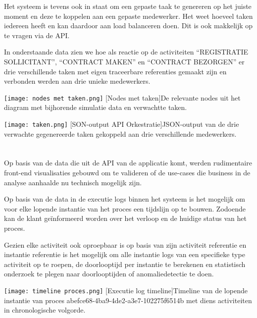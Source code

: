 Het systeem is tevens ook in staat om een gepaste taak te genereren op het juiste moment en deze te koppelen aan een gepaste medewerker. Het weet hoeveel taken iedereen heeft en kan daardoor aan load balanceren doen. Dit is ook makkelijk op te vragen via de API.\newline

In onderstaande data zien we hoe als reactie op de activiteiten “REGISTRATIE SOLLICITANT”, “CONTRACT MAKEN” en “CONTRACT BEZORGEN” er drie verschillende taken met eigen traceerbare referenties gemaakt zijn en verbonden werden aan drie unieke medewerkers.
\begin{center}
  \captionsetup{type=figure}
  \texttt{[image: nodes met taken.png]}
  [Nodes met taken]{De relevante nodes uit het diagram met bijhorende simulatie data en verwachtte taken.}
\end{center}
\begin{center}
  \captionsetup{type=figure}
  \texttt{[image: taken.png]}
  [SON-output API Orkestratie]{JSON-output van de drie verwachte gegenereerde taken gekoppeld aan drie verschillende medewerkers.}
\end{center}
\section{}%
\label{sec:visualisatie}
Op basis van de data die uit de API van de applicatie komt, werden rudimentaire front-end visualisaties gebouwd om te valideren of de use-cases die business in de analyse aanhaalde nu technisch mogelijk zijn. \newline

Op basis van de data in de executie logs binnen het systeem is het mogelijk om voor elke lopende instantie van het proces een tijdslijn op te bouwen. Zodoende kan de klant geïnformeerd worden over het verloop en de huidige status van het proces. \newline

Gezien elke activiteit ook oproepbaar is op basis van zijn activiteit referentie en instantie referentie is het mogelijk om alle instantie logs van een specifieke type activiteit op te roepen, de doorlooptijd per instantie te berekenen en statistisch onderzoek te plegen naar doorlooptijden of anomaliedetectie te doen.
\begin{center}
  \captionsetup{type=figure}
  \texttt{[image: timeline proces.png]}
  [Executie log timeline]{Timeline van de lopende instantie van proces abefce68-4ba9-4de2-a3e7-102275f6514b met diens activiteiten in chronologische volgorde.}
\end{center}

